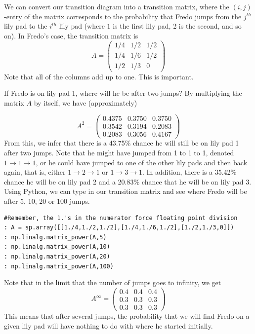 We can convert our transition diagram into a transition matrix, where the $(i,j)$-entry of the matrix corresponds to the probability that Fredo jumps from the $j^{th}$ lily pad to the $i^{th}$ lily pad (where $1$ is the first lily pad, 2 is the second, and so on).
In Fredo's case, the transition matrix is
\[
A = \begin{pmatrix}
1/4 & 1/2 & 1/2\\
1/4 & 1/6 & 1/2\\
1/2 & 1/3 & 0
\end{pmatrix}
\]
Note that all of the columns add up to one.
This is important.

If Fredo is on lily pad 1, where will he be after two jumps?
By multiplying the matrix $A$ by itself, we have (approximately)

\[
A^2 = \begin{pmatrix}
0.4375 & 0.3750 & 0.3750\\
0.3542 & 0.3194 & 0.2083\\
0.2083 & 0.3056 & 0.4167
\end{pmatrix}
\]
From this, we infer that there is a 43.75\% chance he will still be on lily pad 1 after two jumps.
Note that he might have jumped from 1 to 1 to 1, denoted $1 \rightarrow 1 \rightarrow 1$, or he could have jumped to one of the other lily pads and then back again, that is, either $1 \rightarrow 2 \rightarrow 1$ or $1 \rightarrow 3 \rightarrow 1$.
In addition, there is a 35.42\% chance he will be on lily pad 2 and a 20.83\% chance that he will be on lily pad 3.
Using Python, we can type in our transition matrix and see where Fredo will be after 5, 10, 20 or 100 jumps.

\begin{lstlisting}[style=python]
#Remember, the 1.'s in the numerator force floating point division
: A = sp.array([[1./4,1./2,1./2],[1./4,1./6,1./2],[1./2,1./3,0]])
: np.linalg.matrix_power(A,5)
: np.linalg.matrix_power(A,10)
: np.linalg.matrix_power(A,20)
: np.linalg.matrix_power(A,100)
\end{lstlisting}

Note that in the limit that the number of jumps goes to infinity, we get
\[
A^\infty = \begin{pmatrix}
0.4 & 0.4 & 0.4\\
0.3 & 0.3 & 0.3\\
0.3 & 0.3 & 0.3
\end{pmatrix}
\]
This means that after several jumps, the probability that we will find Fredo on a given lily pad will have nothing to do with where he started initially.
 
